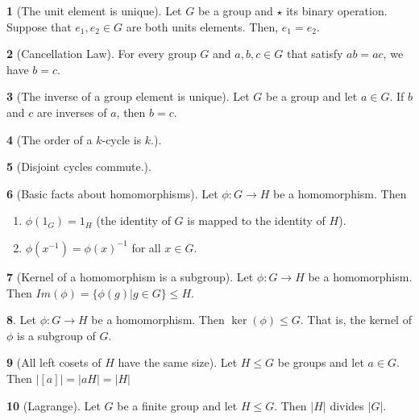 \documentclass[12pt]{article}
\theoremstyle{definition}
\newtheorem{theorem}{\color{ForestGreen}{\textbf{Theorem}}}
\begin{document}
\begin{theorem}[The unit element is unique]
Let $G$ be a group and $\star$ its binary operation. Suppose that $e_1, e_2 \in G$ are both units elements. Then, $e_1 = e_2$.
\end{theorem}

\begin{theorem}[Cancellation Law]
For every group $G$ and $a,b,c \in G$ that satisfy $ab = ac$, we have $b=c$.
\end{theorem}

\begin{theorem}[The inverse of a group element is unique]
Let $G$ be a group and let $a \in G$. If $b$ and $c$ are inverses of $a$, then $b = c$.
\end{theorem}

\begin{theorem}[The order of a $k$-cycle is $k$.]
\end{theorem}

\begin{theorem}[Disjoint cycles commute.]
\end{theorem}

\begin{theorem}[Basic facts about homomorphisms]
Let $\phi : G \to H$ be a homomorphism. Then
\begin{enumerate}
\item $\phi(1_G) = 1_H$ (the identity of $G$ is mapped to the identity of $H$).
\item $\phi(x^{-1}) = \phi(x)^{-1}$ for all $x \in G$.
\end{enumerate}
\end{theorem}

\begin{theorem}[Kernel of a homomorphism is a subgroup]
Let $\phi : G \to H$ be a homomorphism. Then $Im(\phi) = \{ \phi(g) | g \in G \} \leq H$.
\end{theorem}

\begin{theorem}
Let $\phi: G \to H$ be a homomorphism. Then $\ker(\phi) \leq G$. That is, the kernel of $\phi$ is a subgroup of $G$.
\end{theorem}

\begin{theorem}[All left cosets of $H$ have the same size]
Let $H \leq G$ be groups and let $a \in G$. Then $|[a] | = |aH| = |H|$
\end{theorem}

\begin{theorem}[Lagrange]
Let $G$ be a finite group and let $H \leq G$. Then $|H|$ divides $|G|$.
\end{theorem}
\end{document}
